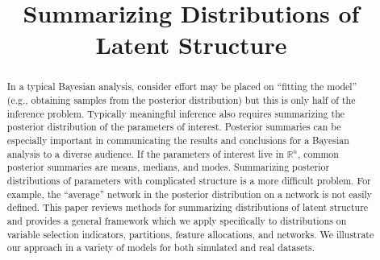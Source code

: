\documentclass[sts]{imsart}
\begin{document}
\begin{frontmatter}

\title{Summarizing Distributions of Latent Structure}

\author{ \corref{}}
\address{}
\vspace{-1ex}

\author{ }
\address{}


\begin{abstract} In a typical Bayesian analysis, consider effort may be placed
on ``fitting the model'' (e.g., obtaining samples from the posterior
distribution) but this is only half of the inference problem.  Typically
meaningful inference also requires summarizing the posterior distribution of
the parameters of interest.  Posterior summaries can be especially important in
communicating the results and conclusions for a Bayesian analysis to a diverse
audience.  If the parameters of interest live in $\mathbb{R}^n$, common
posterior summaries are means, medians, and modes.  Summarizing posterior
distributions of parameters with complicated structure is a more difficult
problem.  For example, the ``average'' network in the posterior distribution on
a network is not easily defined.  This paper reviews methods for summarizing
distributions of latent structure and provides a general framework which we
apply specifically to distributions on variable selection indicators,
partitions, feature allocations, and networks.  We illustrate our approach in a
variety of models for both simulated and real datasets.  \end{abstract}


\begin{keyword}
\end{keyword}

\end{frontmatter}
\end{document}
